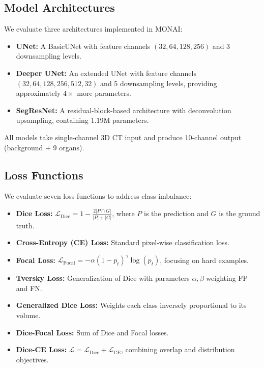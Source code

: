 \documentclass[10pt,twocolumn]{article}
\begin{document}
\subsection{Model Architectures}
\label{sec:models}

We evaluate three architectures implemented in MONAI:

\begin{itemize}[leftmargin=*]
    \item \textbf{UNet:} A BasicUNet with feature channels $(32, 64, 128, 256)$ and 3 downsampling levels.
    \item \textbf{Deeper UNet:} An extended UNet with feature channels $(32, 64, 128, 256, 512, 32)$ and 5 downsampling levels, providing approximately $4\times$ more parameters.
    \item \textbf{SegResNet:} A residual-block-based architecture with deconvolution upsampling, containing 1.19M parameters.
\end{itemize}

All models take single-channel 3D CT input and produce 10-channel output (background + 9 organs).

\subsection{Loss Functions}
\label{sec:loss}

We evaluate seven loss functions to address class imbalance:

\begin{itemize}[leftmargin=*]
    \item \textbf{Dice Loss:} $\mathcal{L}_{\text{Dice}} = 1 - \frac{2|P \cap G|}{|P| + |G|}$, where $P$ is the prediction and $G$ is the ground truth.
    \item \textbf{Cross-Entropy (CE) Loss:} Standard pixel-wise classification loss.
    \item \textbf{Focal Loss:} $\mathcal{L}_{\text{Focal}} = -\alpha(1-p_t)^\gamma \log(p_t)$, focusing on hard examples.
    \item \textbf{Tversky Loss:} Generalization of Dice with parameters $\alpha, \beta$ weighting FP and FN.
    \item \textbf{Generalized Dice Loss:} Weights each class inversely proportional to its volume.
    \item \textbf{Dice-Focal Loss:} Sum of Dice and Focal losses.
    \item \textbf{Dice-CE Loss:} $\mathcal{L} = \mathcal{L}_{\text{Dice}} + \mathcal{L}_{\text{CE}}$, combining overlap and distribution objectives.
\end{itemize}
\end{document}
